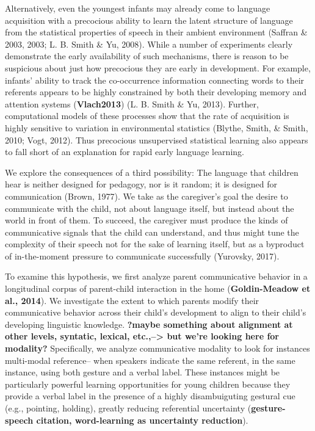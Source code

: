 \documentclass[10pt, letterpaper]{article}
\begin{document}
Alternatively, even the youngest infants may already come to language
acquisition with a precocious ability to learn the latent structure of
language from the statistical properties of speech in their ambient
environment (Saffran \& 2003, 2003; L. B. Smith \& Yu, 2008). While a
number of experiments clearly demonstrate the early availability of such
mechanisms, there is reason to be suspicious about just how precocious
they are early in development. For example, infants' ability to track
the co-occurrence information connecting words to their referents
appears to be highly constrained by both their developing memory and
attention systems (\textbf{Vlach2013}) (L. B. Smith \& Yu, 2013).
Further, computational models of these processes show that the rate of
acquisition is highly sensitive to variation in environmental statistics
(Blythe, Smith, \& Smith, 2010; Vogt, 2012). Thus precocious
unsupervised statistical learning also appears to fall short of an
explanation for rapid early language learning.

We explore the consequences of a third possibility: The language that
children hear is neither designed for pedagogy, nor is it random; it is
designed for communication (Brown, 1977). We take as the caregiver's
goal the desire to communicate with the child, not about language
itself, but instead about the world in front of them. To succeed, the
caregiver must produce the kinds of communicative signals that the child
can understand, and thus might tune the complexity of their speech not
for the sake of learning itself, but as a byproduct of in-the-moment
pressure to communicate successfully (Yurovsky, 2017).

To examine this hypothesis, we first analyze parent communicative
behavior in a longitudinal corpus of parent-child interaction in the
home (\textbf{Goldin-Meadow et al., 2014}). We investigate the extent to
which parents modify their communicative behavior across their child's
development to align to their child's developing linguistic knowledge.
\textbf{?maybe something about alignment at other levels, syntatic,
lexical, etc.,--\textgreater{} but we're looking here for modality?}
Specifically, we analyze communicative modality to look for instances
multi-modal reference-- when speakers indicate the same referent, in the
same instance, using both gesture and a verbal label. These instances
might be particularly powerful learning opportunities for young children
because they provide a verbal label in the presence of a highly
disambuiguting gestural cue (e.g., pointing, holding), greatly reducing
referential uncertainty (\textbf{gesture-speech citation, word-learning
as uncertainty reduction}).
\end{document}
